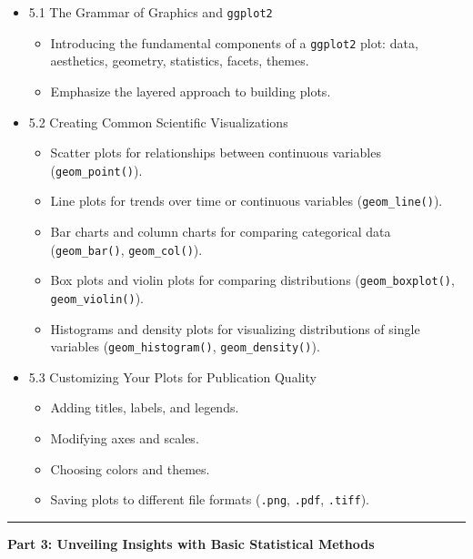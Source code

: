 \documentclass[
  letterpaper,
  DIV=11,
  numbers=noendperiod]{scrreprt}
\providecommand{\tightlist}{%
  \setlength{\itemsep}{0pt}\setlength{\parskip}{0pt}}\usepackage{longtable,booktabs,array}
\begin{document}
\begin{itemize}
\tightlist
\item
  5.1 The Grammar of Graphics and \texttt{ggplot2}

  \begin{itemize}
  \tightlist
  \item
    Introducing the fundamental components of a \texttt{ggplot2} plot:
    data, aesthetics, geometry, statistics, facets, themes.
  \item
    Emphasize the layered approach to building plots.
  \end{itemize}
\item
  5.2 Creating Common Scientific Visualizations

  \begin{itemize}
  \tightlist
  \item
    Scatter plots for relationships between continuous variables
    (\texttt{geom\_point()}).
  \item
    Line plots for trends over time or continuous variables
    (\texttt{geom\_line()}).
  \item
    Bar charts and column charts for comparing categorical data
    (\texttt{geom\_bar()}, \texttt{geom\_col()}).
  \item
    Box plots and violin plots for comparing distributions
    (\texttt{geom\_boxplot()}, \texttt{geom\_violin()}).
  \item
    Histograms and density plots for visualizing distributions of single
    variables (\texttt{geom\_histogram()}, \texttt{geom\_density()}).
  \end{itemize}
\item
  5.3 Customizing Your Plots for Publication Quality

  \begin{itemize}
  \tightlist
  \item
    Adding titles, labels, and legends.
  \item
    Modifying axes and scales.
  \item
    Choosing colors and themes.
  \item
    Saving plots to different file formats (\texttt{.png},
    \texttt{.pdf}, \texttt{.tiff}).
  \end{itemize}
\end{itemize}

\begin{center}\rule{0.5\linewidth}{0.5pt}\end{center}

\textbf{Part 3: Unveiling Insights with Basic Statistical Methods}
\end{document}

